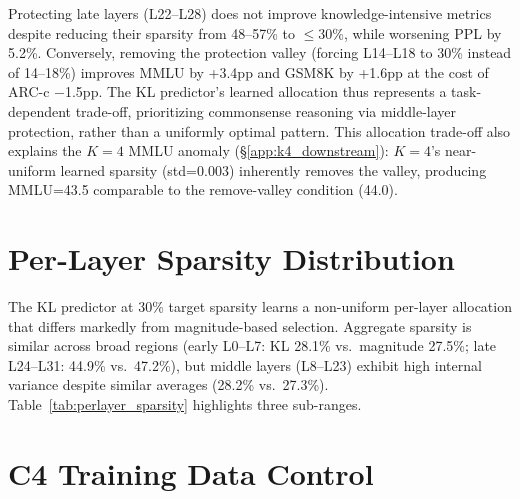 Protecting late layers (L22--L28) does not improve knowledge-intensive metrics despite reducing their sparsity from 48--57\% to $\leq$30\%, while worsening PPL by 5.2\%.
Conversely, removing the protection valley (forcing L14--L18 to 30\% instead of 14--18\%) improves MMLU by +3.4pp and GSM8K by +1.6pp at the cost of ARC-c $-$1.5pp.
The KL predictor's learned allocation thus represents a task-dependent trade-off, prioritizing commonsense reasoning via middle-layer protection, rather than a uniformly optimal pattern.
This allocation trade-off also explains the $K{=}4$ MMLU anomaly (\S\ref{app:k4_downstream}): $K{=}4$'s near-uniform learned sparsity (std=0.003) inherently removes the valley, producing MMLU=43.5 comparable to the remove-valley condition (44.0).

\section{Per-Layer Sparsity Distribution}
\label{app:perlayer_sparsity}

The KL predictor at 30\% target sparsity learns a non-uniform per-layer allocation that differs markedly from magnitude-based selection.
Aggregate sparsity is similar across broad regions (early L0--L7: KL 28.1\% vs.\ magnitude 27.5\%; late L24--L31: 44.9\% vs.\ 47.2\%), but middle layers (L8--L23) exhibit high internal variance despite similar averages (28.2\% vs.\ 27.3\%).
Table~\ref{tab:perlayer_sparsity} highlights three sub-ranges.

\begin{table}[h]
\centering
\caption{Per-layer sparsity sub-ranges: KL predictor vs.\ magnitude (LLaMA-3.1-8B, 30\%, uniform allocation). Ranges denote min--max across layers in each group.}
\label{tab:perlayer_sparsity}
\end{table}

\section{C4 Training Data Control}
\label{app:c4_control}

